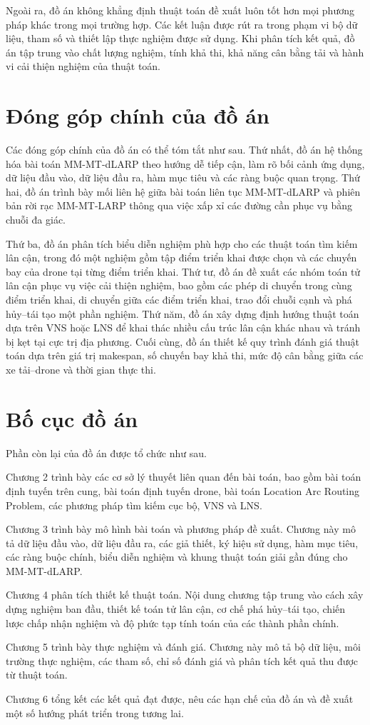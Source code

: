 Ngoài ra, đồ án không khẳng định thuật toán đề xuất luôn tốt hơn mọi phương pháp khác trong mọi trường hợp. Các kết luận được rút ra trong phạm vi bộ dữ liệu, tham số và thiết lập thực nghiệm được sử dụng. Khi phân tích kết quả, đồ án tập trung vào chất lượng nghiệm, tính khả thi, khả năng cân bằng tải và hành vi cải thiện nghiệm của thuật toán.

\section{Đóng góp chính của đồ án}

Các đóng góp chính của đồ án có thể tóm tắt như sau. Thứ nhất, đồ án hệ thống hóa bài toán MM-MT-dLARP theo hướng dễ tiếp cận, làm rõ bối cảnh ứng dụng, dữ liệu đầu vào, dữ liệu đầu ra, hàm mục tiêu và các ràng buộc quan trọng. Thứ hai, đồ án trình bày mối liên hệ giữa bài toán liên tục MM-MT-dLARP và phiên bản rời rạc MM-MT-LARP thông qua việc xấp xỉ các đường cần phục vụ bằng chuỗi đa giác.

Thứ ba, đồ án phân tích biểu diễn nghiệm phù hợp cho các thuật toán tìm kiếm lân cận, trong đó một nghiệm gồm tập điểm triển khai được chọn và các chuyến bay của drone tại từng điểm triển khai. Thứ tư, đồ án đề xuất các nhóm toán tử lân cận phục vụ việc cải thiện nghiệm, bao gồm các phép di chuyển trong cùng điểm triển khai, di chuyển giữa các điểm triển khai, trao đổi chuỗi cạnh và phá hủy--tái tạo một phần nghiệm. Thứ năm, đồ án xây dựng định hướng thuật toán dựa trên VNS hoặc LNS để khai thác nhiều cấu trúc lân cận khác nhau và tránh bị kẹt tại cực trị địa phương. Cuối cùng, đồ án thiết kế quy trình đánh giá thuật toán dựa trên giá trị makespan, số chuyến bay khả thi, mức độ cân bằng giữa các xe tải--drone và thời gian thực thi.

\section{Bố cục đồ án}

Phần còn lại của đồ án được tổ chức như sau.

Chương 2 trình bày các cơ sở lý thuyết liên quan đến bài toán, bao gồm bài toán định tuyến trên cung, bài toán định tuyến drone, bài toán Location Arc Routing Problem, các phương pháp tìm kiếm cục bộ, VNS và LNS.

Chương 3 trình bày mô hình bài toán và phương pháp đề xuất. Chương này mô tả dữ liệu đầu vào, dữ liệu đầu ra, các giả thiết, ký hiệu sử dụng, hàm mục tiêu, các ràng buộc chính, biểu diễn nghiệm và khung thuật toán giải gần đúng cho MM-MT-dLARP.

Chương 4 phân tích thiết kế thuật toán. Nội dung chương tập trung vào cách xây dựng nghiệm ban đầu, thiết kế toán tử lân cận, cơ chế phá hủy--tái tạo, chiến lược chấp nhận nghiệm và độ phức tạp tính toán của các thành phần chính.

Chương 5 trình bày thực nghiệm và đánh giá. Chương này mô tả bộ dữ liệu, môi trường thực nghiệm, các tham số, chỉ số đánh giá và phân tích kết quả thu được từ thuật toán.

Chương 6 tổng kết các kết quả đạt được, nêu các hạn chế của đồ án và đề xuất một số hướng phát triển trong tương lai.
